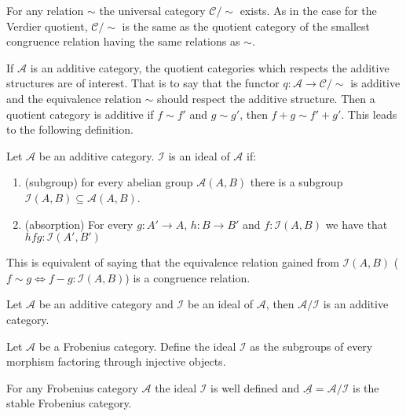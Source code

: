     \begin{remark}
        For any relation $\sim$ the universal category $\mathcal{C}/\sim$ exists. As in the case for the Verdier quotient, $\mathcal{C}/\sim$ is the same as the quotient category of the smallest congruence relation having the same relations as $\sim$.
    \end{remark}

    If $\mathcal{A}$ is an additive category, the quotient categories which respects the additive structures are of interest. That is to say that the functor $q:\mathcal{A}\rightarrow \mathcal{C}/\sim$ is additive and the equivalence relation $\sim$ should respect the additive structure. Then a quotient category is additive if $f\sim f'$ and $g\sim g'$, then $f+g\sim f'+g'$. This leads to the following definition. 

    \begin{definition}
        Let $\mathcal{A}$ be an additive category. $\mathcal{I}$ is an ideal of $\mathcal{A}$ if:
        \begin{enumerate}
            \item (subgroup) for every abelian group $\mathcal{A}(A,B)$ there is a subgroup $\mathcal{I}(A,B)\subseteq\mathcal{A}(A,B)$.
            \item (absorption) For every $g:A'\rightarrow A$, $h:B\rightarrow B'$ and $f:\mathcal{I}(A,B)$ we have that $hfg:\mathcal{I}(A',B')$
        \end{enumerate}
        This is equivalent of saying that the equivalence relation gained from $\mathcal{I}(A,B)$ ($f\sim g \iff f-g:\mathcal{I}(A,B)$) is a congruence relation.
    \end{definition}

    \begin{corollary}
        Let $\mathcal{A}$ be an additive category and $\mathcal{I}$ be an ideal of $\mathcal{A}$, then $\mathcal{A}/\mathcal{I}$ is an additive category.
    \end{corollary}

    Let $\mathcal{A}$ be a Frobenius category. Define the ideal $\mathcal{I}$ as the subgroups of every morphism factoring through injective objects.

    \begin{prop}
        For any Frobenius category $\mathcal{A}$ the ideal $\mathcal{I}$ is well defined and $\underline{\mathcal{A}}=\mathcal{A}/\mathcal{I}$ is the stable Frobenius category.
    \end{prop}

